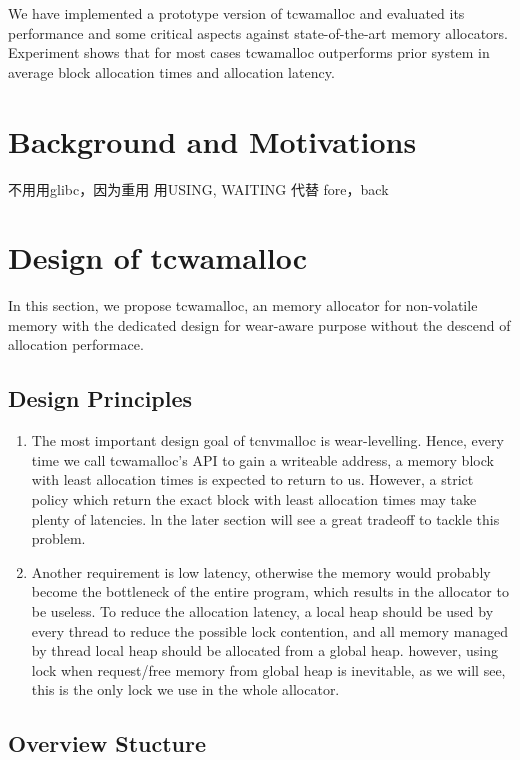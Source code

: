 \documentclass{vldb}
\begin{document}
We have implemented a prototype version of tcwamalloc and evaluated its performance and some critical aspects against state-of-the-art memory allocators. 
Experiment shows that for most cases tcwamalloc outperforms prior system in average block allocation times and allocation latency.

\section{Background and Motivations}

不用用glibc，因为重用
用USING, WAITING 代替 fore，back

\section{Design of tcwamalloc}

In this section, we propose tcwamalloc, an memory allocator for non-volatile memory with the dedicated design for wear-aware purpose without the descend of allocation performace.

\subsection{Design Principles}

\begin{enumerate}
    \item The most important design goal of tcnvmalloc is wear-levelling. Hence, every time we call tcwamalloc’s API to gain a writeable address, a memory block with least allocation times is expected to return to us. However, a strict policy which return the exact block with least allocation times may take plenty of latencies. ln the later section will see a great tradeoff to tackle this problem.
    \item Another requirement is low latency, otherwise the memory would probably become the bottleneck of the entire program, which results in the allocator to be useless. To reduce the allocation latency, a local heap should be used by every thread to reduce the possible lock contention, and all memory managed by thread local heap should be allocated from a global heap. however, using lock when request/free memory from global heap is inevitable, as we will see, this is the only lock we use in the whole allocator.
\end{enumerate}

\subsection{Overview Stucture}
\end{document}
